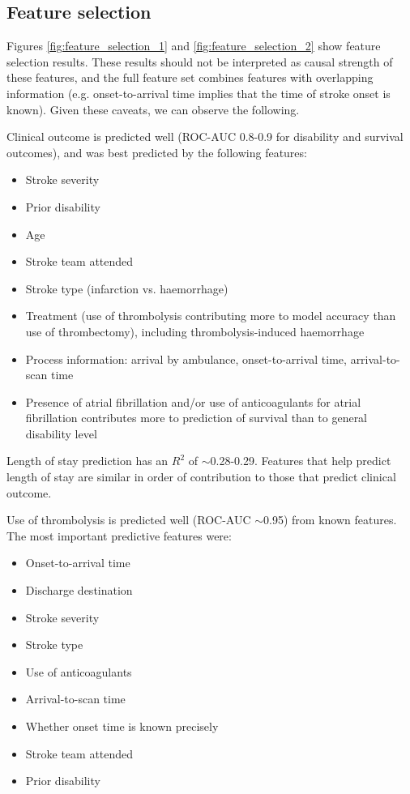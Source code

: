\subsection{Feature selection}

Figures \ref{fig:feature_selection_1} and \ref{fig:feature_selection_2} show feature selection results. These results should not be interpreted as causal strength of these features, and the full feature set combines features with overlapping information (e.g. onset-to-arrival time implies that the time of stroke onset is known). Given these caveats, we can observe the following.

Clinical outcome is predicted well (ROC-AUC 0.8-0.9 for disability and survival outcomes), and was best predicted by the following features:

\begin{itemize}
    \item Stroke severity
    \item Prior disability
    \item Age
    \item Stroke team attended
    \item Stroke type (infarction vs. haemorrhage)
    \item Treatment (use of thrombolysis contributing more to model accuracy than use of thrombectomy), including thrombolysis-induced haemorrhage
    \item Process information: arrival by ambulance, onset-to-arrival time, arrival-to-scan time
    \item Presence of atrial fibrillation and/or use of anticoagulants for atrial fibrillation contributes more to prediction of survival than to general disability level
\end{itemize}

Length of stay prediction has an $R^2$ of $\sim$0.28-0.29. Features that help predict length of stay are similar in order of contribution to those that predict clinical outcome.

Use of thrombolysis is predicted well (ROC-AUC $\sim$0.95) from known features. The most important predictive features were:

\begin{itemize}
    \item Onset-to-arrival time
    \item Discharge destination
    \item Stroke severity
    \item Stroke type
    \item Use of anticoagulants
    \item Arrival-to-scan time
    \item Whether onset time is known precisely
    \item Stroke team attended
    \item Prior disability    
\end{itemize}

